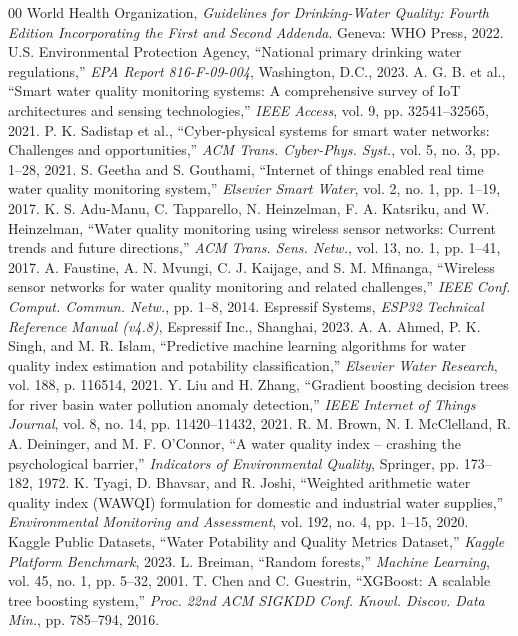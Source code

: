 \documentclass[conference]{IEEEtran}
\begin{document}
\begin{thebibliography}{00}
 World Health Organization, \textit{Guidelines for Drinking-Water Quality: Fourth Edition Incorporating the First and Second Addenda}. Geneva: WHO Press, 2022.
 U.S. Environmental Protection Agency, ``National primary drinking water regulations,'' \textit{EPA Report 816-F-09-004}, Washington, D.C., 2023.
 A. G. B. et al., ``Smart water quality monitoring systems: A comprehensive survey of IoT architectures and sensing technologies,'' \textit{IEEE Access}, vol. 9, pp. 32541--32565, 2021.
 P. K. Sadistap et al., ``Cyber-physical systems for smart water networks: Challenges and opportunities,'' \textit{ACM Trans. Cyber-Phys. Syst.}, vol. 5, no. 3, pp. 1--28, 2021.
 S. Geetha and S. Gouthami, ``Internet of things enabled real time water quality monitoring system,'' \textit{Elsevier Smart Water}, vol. 2, no. 1, pp. 1--19, 2017.
 K. S. Adu-Manu, C. Tapparello, N. Heinzelman, F. A. Katsriku, and W. Heinzelman, ``Water quality monitoring using wireless sensor networks: Current trends and future directions,'' \textit{ACM Trans. Sens. Netw.}, vol. 13, no. 1, pp. 1--41, 2017.
 A. Faustine, A. N. Mvungi, C. J. Kaijage, and S. M. Mfinanga, ``Wireless sensor networks for water quality monitoring and related challenges,'' \textit{IEEE Conf. Comput. Commun. Netw.}, pp. 1--8, 2014.
 Espressif Systems, \textit{ESP32 Technical Reference Manual (v4.8)}, Espressif Inc., Shanghai, 2023.
 A. A. Ahmed, P. K. Singh, and M. R. Islam, ``Predictive machine learning algorithms for water quality index estimation and potability classification,'' \textit{Elsevier Water Research}, vol. 188, p. 116514, 2021.
 Y. Liu and H. Zhang, ``Gradient boosting decision trees for river basin water pollution anomaly detection,'' \textit{IEEE Internet of Things Journal}, vol. 8, no. 14, pp. 11420--11432, 2021.
 R. M. Brown, N. I. McClelland, R. A. Deininger, and M. F. O'Connor, ``A water quality index -- crashing the psychological barrier,'' \textit{Indicators of Environmental Quality}, Springer, pp. 173--182, 1972.
 K. Tyagi, D. Bhavsar, and R. Joshi, ``Weighted arithmetic water quality index (WAWQI) formulation for domestic and industrial water supplies,'' \textit{Environmental Monitoring and Assessment}, vol. 192, no. 4, pp. 1--15, 2020.
 Kaggle Public Datasets, ``Water Potability and Quality Metrics Dataset,'' \textit{Kaggle Platform Benchmark}, 2023.
 L. Breiman, ``Random forests,'' \textit{Machine Learning}, vol. 45, no. 1, pp. 5--32, 2001.
 T. Chen and C. Guestrin, ``XGBoost: A scalable tree boosting system,'' \textit{Proc. 22nd ACM SIGKDD Conf. Knowl. Discov. Data Min.}, pp. 785--794, 2016.
\end{thebibliography}
\end{document}

